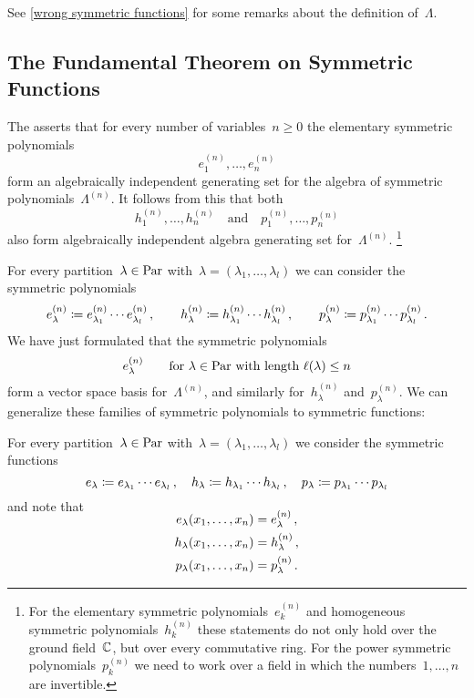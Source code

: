 \documentclass[a4paper,11pt]{scrartcl}
\begin{document}
See \cref{wrong symmetric functions} for some remarks about the definition of~$\Lambda$.



\subsection{The Fundamental Theorem on Symmetric Functions}

The  asserts that for every number of variables~$n \geq 0$ the elementary symmetric polynomials
\[
  e^{(n)}_1, \dotsc, e^{(n)}_n
\]
form an algebraically independent generating set for the algebra of symmetric polynomials~$\Lambda^{(n)}$.
It follows from this that both
\[
  h^{(n)}_1, \dotsc, h^{(n)}_n
  \quad\text{and}\quad
  p^{(n)}_1, \dotsc, p^{(n)}_n
\]
also form algebraically independent algebra generating set for~$\Lambda^{(n)}$.%
\footnote{
  For the elementary symmetric polynomials~$e^{(n)}_k$ and homogeneous symmetric polynomials~$h^{(n)}_k$ these statements do not only hold over the ground field~$\mathbb{C}$, but over every commutative ring.
  For the power symmetric polynomials~$p^{(n)}_k$ we need to work over a field in which the numbers~$1, \dotsc, n$ are invertible.
}

For every partition~$\lambda \in \mathrm{Par}$ with~$\lambda = (\lambda_1, \dotsc, \lambda_l)$ we can consider the symmetric polynomials
\[
  e^{(n)}_\lambda
  \coloneqq
  e^{(n)}_{\lambda_1} \dotsm e^{(n)}_{\lambda_l} \,,
  \qquad
  h^{(n)}_\lambda
  \coloneqq
  h^{(n)}_{\lambda_1} \dotsm h^{(n)}_{\lambda_l} \,,
  \qquad
  p^{(n)}_\lambda
  \coloneqq
  p^{(n)}_{\lambda_1} \dotsm p^{(n)}_{\lambda_l} \,.
\]
We have just formulated that the symmetric polynomials
\[
  e^{(n)}_\lambda
  \qquad
  \text{for $\lambda \in \mathrm{Par}$ with length~$\ell(\lambda) \leq n$}
\]
form a vector space basis for~$\Lambda^{(n)}$, and similarly for~$h^{(n)}_\lambda$ and~$p^{(n)}_\lambda$.
We can generalize these families of symmetric polynomials to symmetric functions:

\begin{example}
  For every partition~$\lambda \in \mathrm{Par}$ with~$\lambda = (\lambda_1, \dotsc, \lambda_l)$ we consider the symmetric functions
  \[
    e_\lambda
    \coloneqq
    e_{\lambda_1} \dotsm e_{\lambda_l} \,,
    \quad
    h_\lambda
    \coloneqq
    h_{\lambda_1} \dotsm h_{\lambda_l} \,,
    \quad
    p_\lambda
    \coloneqq
    p_{\lambda_1} \dotsm p_{\lambda_l}
  \]
  and note that
  \begin{align*}
    \SwapAboveDisplaySkip
    e_\lambda(x_1, \dotsc, x_n)
    &=
    e^{(n)}_\lambda \,,
    \\
    h_\lambda(x_1, \dotsc, x_n)
    &=
    h^{(n)}_\lambda \,,
    \\
    p_\lambda(x_1, \dotsc, x_n)
    &=
    p^{(n)}_\lambda \,.
  \end{align*}
\end{example}
\end{document}
